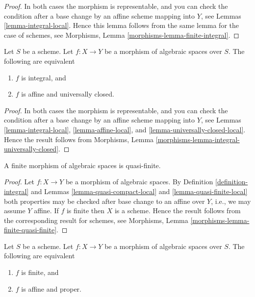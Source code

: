 \begin{proof}
In both cases the morphism is representable, and you can check the condition
after a base change by an affine scheme mapping into $Y$, see
Lemmas \ref{lemma-integral-local}. Hence this lemma follows from the
same lemma for the case of schemes, see
Morphisms, Lemma \ref{morphisms-lemma-finite-integral}.
\end{proof}

\begin{lemma}
\label{lemma-integral-universally-closed}
Let $S$ be a scheme.
Let $f : X \to Y$ be a morphism of algebraic spaces over $S$.
The following are equivalent
\begin{enumerate}
\item $f$ is integral, and
\item $f$ is affine and universally closed.
\end{enumerate}
\end{lemma}

\begin{proof}
In both cases the morphism is representable, and you can check the condition
after a base change by an affine scheme mapping into $Y$, see
Lemmas \ref{lemma-integral-local},
\ref{lemma-affine-local}, and
\ref{lemma-universally-closed-local}.
Hence the result follows from
Morphisms, Lemma \ref{morphisms-lemma-integral-universally-closed}.
\end{proof}

\begin{lemma}
\label{lemma-finite-quasi-finite}
A finite morphism of algebraic spaces is quasi-finite.
\end{lemma}

\begin{proof}
Let $f : X \to Y$ be a morphism of algebraic spaces.
By
Definition \ref{definition-integral}
and
Lemmas \ref{lemma-quasi-compact-local} and
\ref{lemma-quasi-finite-local}
both properties may be checked after base change to an affine over $Y$,
i.e., we may assume $Y$ affine.
If $f$ is finite then $X$ is a scheme.
Hence the result follows from the corresponding result for schemes, see
Morphisms, Lemma \ref{morphisms-lemma-finite-quasi-finite}.
\end{proof}

\begin{lemma}
\label{lemma-finite-proper}
Let $S$ be a scheme. Let $f : X \to Y$ be a morphism of algebraic spaces over
$S$. The following are equivalent
\begin{enumerate}
\item $f$ is finite, and
\item $f$ is affine and proper.
\end{enumerate}
\end{lemma}

